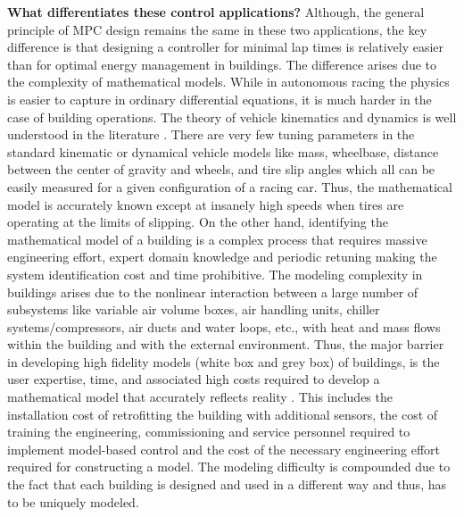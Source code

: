 \noindent \textbf{What differentiates these control applications?}
Although, the general principle of MPC design remains the same in these two applications, the key difference is that designing a controller for minimal lap times is relatively easier than for optimal energy management in buildings.
The difference arises due to the complexity of mathematical models.
While in autonomous racing the physics is easier to capture in ordinary differential equations, it is much harder in the case of building operations.
The theory of vehicle kinematics and dynamics is well understood in the literature \cite{Rajamani2011}.
There are very few tuning parameters in the standard kinematic or dynamical vehicle models like mass, wheelbase, distance between the center of gravity and wheels, and tire slip angles which all can be easily measured for a given configuration of a racing car.
Thus, the mathematical model is accurately known except at insanely high speeds when tires are operating at the limits of slipping.
On the other hand, identifying the mathematical model of a building is a complex process that requires massive engineering effort, expert domain knowledge and periodic retuning making the system identification cost and time prohibitive.
The modeling complexity in buildings arises due to the nonlinear interaction between a large number of subsystems like variable air volume boxes, air handling units, chiller systems/compressors, air ducts and water loops, etc., with heat and mass flows within the building and with the external environment.
Thus, the major barrier in developing high fidelity models (white box and grey box) of buildings, is the user expertise, time, and associated high costs required to develop a mathematical model that accurately reflects reality \cite{Sturzenegger2016}.
This includes the installation cost of retrofitting the building with additional sensors, the cost of training the engineering, commissioning and service personnel required to implement model-based control and the cost of the necessary engineering effort required for constructing a model.
The modeling difficulty is compounded due to the fact that each building is designed and used in a different way and thus, has to be uniquely modeled.

